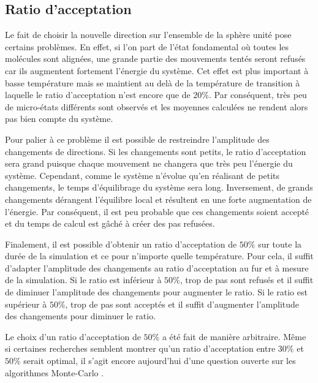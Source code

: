 \documentclass[11pt,a4paper]{article}
\numberwithin{equation}{section}
\begin{document}
\subsection{Ratio d'acceptation}
Le fait de choisir la nouvelle direction sur l'ensemble de la sphère unité pose certains problèmes. En effet, si l'on part de l'état fondamental où toutes les molécules sont alignées, une grande partie des mouvements tentés seront refusés car ils augmentent fortement l'énergie du système. Cet effet est plus important à basse température mais se maintient au delà de la température de transition à laquelle le ratio d'acceptation n'est encore que de $20\%$. Par conséquent, très peu de micro-états différents sont observés et les moyennes calculées ne rendent alors pas bien compte du système.
\medskip

Pour palier à ce problème il est possible de restreindre l'amplitude des changements de directions. Si les changements sont petits, le ratio d'acceptation sera grand puisque chaque mouvement ne changera que très peu l'énergie du système. Cependant, comme le système n'évolue qu'en réalisant de petits changements, le temps d'équilibrage du système sera long. Inversement, de grands changements dérangent l'équilibre local et résultent en une forte augmentation de l'énergie. Par conséquent, il est peu probable que ces changements soient accepté et du temps de calcul est gâché à créer des pas refusées.
\medskip

Finalement, il est possible d'obtenir un ratio d'acceptation de $50\%$ sur toute la durée de la simulation et ce pour n'importe quelle température. Pour cela, il suffit d'adapter l'amplitude des changements au ratio d'acceptation au fur et à mesure de la simulation. Si le ratio est inférieur à $50\%$, trop de pas sont refusés et il suffit de diminuer l'amplitude des changements pour augmenter le ratio. Si le ratio est supérieur à $50\%$, trop de pas sont acceptés et il suffit d'augmenter l'amplitude des changements pour diminuer le ratio. 
\medskip

Le choix d'un ratio d'acceptation de $50\%$ a été fait de manière arbitraire. Même si certaines recherches \cite{acceptanceratio} semblent montrer qu'un ratio d'acceptation entre $30\%$ et $50\%$ serait optimal, il s'agit encore aujourd'hui d'une question ouverte sur les algorithmes Monte-Carlo \cite{acceptanceratio1}.
\end{document}
